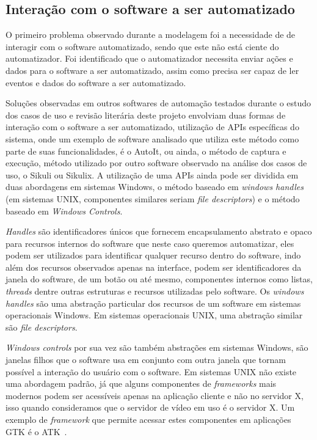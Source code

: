 \documentclass[tg]{mdtufsm}
\begin{document}
            \subsection {Interação com o software a ser automatizado}

                O primeiro problema observado durante a modelagem foi a necessidade de de interagir com o software automatizado, sendo que este não está ciente do automatizador. Foi identificado que o automatizador necessita enviar ações e dados para o software a ser automatizado, assim como precisa ser capaz de ler eventos e dados do software a ser automatizado.

                Soluções observadas em outros softwares de automação testados durante o estudo dos casos de uso e revisão literária deste projeto envolviam duas formas de interação com o software a ser automatizado, utilização de APIs específicas do sistema, onde um exemplo de software analisado que utiliza este método como parte de suas funcionalidades, é o AutoIt, ou ainda, o método de captura e execução, método utilizado por outro software observado na análise dos casos de uso, o Sikuli ou Sikulix. A utilização de uma APIs ainda pode ser dividida em duas abordagens em sistemas Windows, o método baseado em \emph{windows handles} (em sistemas UNIX, componentes similares seriam \emph{file descriptors}) e o método baseado em \emph{Windows Controls}.

                \emph{Handles} são identificadores únicos que fornecem encapsulamento abstrato e opaco para recursos internos do software que neste caso queremos automatizar, eles podem ser utilizados para identificar qualquer recurso dentro do software, indo além dos recursos observados apenas na interface, podem ser identificadores da janela do software, de um botão ou até mesmo, componentes internos como listas, \emph{threads} dentre outras estruturas e recursos utilizadas pelo software. Os \emph{windows handles} são uma abstração particular dos recursos de um software em sistemas operacionais Windows. Em sistemas operacionais UNIX, uma abstração similar são \emph{file descriptors}.

                \emph{Windows controls} por sua vez são também abstrações em sistemas Windows, são janelas filhos que o software usa em conjunto com outra janela que tornam possível a interação do usuário com o software. Em sistemas UNIX não existe uma abordagem padrão, já que alguns componentes de \emph{frameworks} mais modernos podem ser acessíveis apenas na aplicação cliente e não no servidor X, isso quando consideramos que o servidor de vídeo em uso é o servidor X. Um exemplo de \emph{framework} que permite acessar estes componentes em aplicações GTK é o ATK~\cite{atk}.
\end{document}
